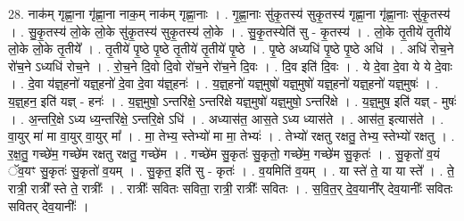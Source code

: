 \documentclass[17pt]{extarticle}
\begin{document}
28. नाक॑म् गृह्णा॒ना गृ॑ह्णा॒ना नाक॒म् नाक॑म् गृह्णा॒नाः । . गृ॒ह्णा॒नाः सु॑कृ॒तस्य॑ सुकृ॒तस्य॑ गृह्णा॒ना गृ॑ह्णा॒नाः सु॑कृ॒तस्य॑ । . सु॒कृ॒तस्य॑ लो॒के लो॒के सु॑कृ॒तस्य॑ सुकृ॒तस्य॑ लो॒के । . सु॒कृ॒तस्येति॑ सु - कृ॒तस्य॑ । . लो॒के तृ॒तीये॑ तृ॒तीये॑ लो॒के लो॒के तृ॒तीये᳚ । . तृ॒तीये॑ पृ॒ष्ठे पृ॒ष्ठे तृ॒तीये॑ तृ॒तीये॑ पृ॒ष्ठे । . पृ॒ष्ठे अध्यधि॑ पृ॒ष्ठे पृ॒ष्ठे अधि॑ । . अधि॑ रोच॒ने रो॑च॒ने ऽध्यधि॑ रोच॒ने । . रो॒च॒ने दि॒वो दि॒वो रो॑च॒ने रो॑च॒ने दि॒वः । . दि॒व इति॑ दि॒वः । . ये दे॒वा दे॒वा ये ये दे॒वाः । . दे॒वा य॑ज्ञ्॒हनो॑ यज्ञ्॒हनो॑ दे॒वा दे॒वा य॑ज्ञ्॒हनः॑ । . य॒ज्ञ्॒हनो॑ यज्ञ्॒मुषो॑ यज्ञ्॒मुषो॑ यज्ञ्॒हनो॑ यज्ञ्॒हनो॑ यज्ञ्॒मुषः॑ । . य॒ज्ञ्॒हन॒ इति॑ यज्ञ् - हनः॑ । . य॒ज्ञ्॒मुषो॒ ऽन्तरि॑क्षे॒ ऽन्तरि॑क्षे यज्ञ्॒मुषो॑ यज्ञ्॒मुषो॒ ऽन्तरि॑क्षे । . य॒ज्ञ्॒मुष॒ इति॑ यज्ञ् - मुषः॑ । . अ॒न्तरि॒क्षे ऽध्य ध्य॒न्तरि॑क्षे॒ ऽन्तरि॒क्षे ऽधि॑ । . अध्यास॑त॒ आस॒ते ऽध्य ध्यास॑ते । . आस॑त॒ इत्यास॑ते । . वा॒युर् मा॑ मा वा॒युर् वा॒युर् मा᳚ । . मा॒ तेभ्य॒ स्तेभ्यो॑ मा मा॒ तेभ्यः॑ । . तेभ्यो॑ रक्षतु रक्षतु॒ तेभ्य॒ स्तेभ्यो॑ रक्षतु । . र॒क्ष॒तु॒ गच्छे॑म॒ गच्छे॑म रक्षतु रक्षतु॒ गच्छे॑म । . गच्छे॑म सु॒कृतः॑ सु॒कृतो॒ गच्छे॑म॒ गच्छे॑म सु॒कृतः॑ । . सु॒कृतो॑ व॒यं ॅव॒यꣳ सु॒कृतः॑ सु॒कृतो॑ व॒यम् । . सु॒कृत॒ इति॑ सु - कृतः॑ । . व॒यमिति॑ व॒यम् । . या स्ते॑ ते॒ या या स्ते᳚ । . ते॒ रात्री॒ रात्री᳚ स्ते ते॒ रात्रीः᳚ । . रात्रीः᳚ सवितः सविता॒ रात्री॒ रात्रीः᳚ सवितः । . स॒वि॒त॒र् दे॒व॒यानी᳚र् देव॒यानीः᳚ सवितः सवितर् देव॒यानीः᳚ । \newline
\end{document}
